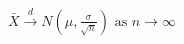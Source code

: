 \documentclass[preview]{standalone}
\begin{document}
\begin{align*}
\bar{X} \xrightarrow{d} N\left(\mu, \frac{\sigma}{\sqrt{n}}\right) \text{ as } n \to \infty
\end{align*}
\end{document}
